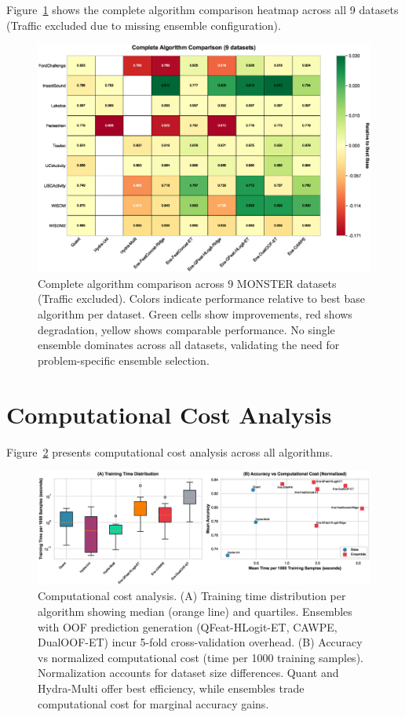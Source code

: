 \documentclass[pdflatex,sn-basic]{sn-jnl}           %
\theoremstyle{thmstyleone}%
\theoremstyle{thmstyletwo}%
\theoremstyle{thmstylethree}%
\begin{document}
\begin{appendices}
Figure~\ref{fig:full_heatmap} shows the complete algorithm comparison heatmap across all 9 datasets (Traffic excluded due to missing ensemble configuration).

\begin{figure}[!htb]
\centering
\includegraphics[width=\textwidth]{figureA1_full_heatmap}
\caption{Complete algorithm comparison across 9 MONSTER datasets (Traffic excluded). Colors indicate performance relative to best base algorithm per dataset. Green cells show improvements, red shows degradation, yellow shows comparable performance. No single ensemble dominates across all datasets, validating the need for problem-specific ensemble selection.}\label{fig:full_heatmap}
\end{figure}

\clearpage

\section{Computational Cost Analysis}\label{appE}

Figure~\ref{fig:computational} presents computational cost analysis across all algorithms.

\begin{figure}[!htb]
\centering
\includegraphics[width=\textwidth]{figureA2_computational_cost}
\caption{Computational cost analysis. (A) Training time distribution per algorithm showing median (orange line) and quartiles. Ensembles with OOF prediction generation (QFeat-HLogit-ET, CAWPE, DualOOF-ET) incur 5-fold cross-validation overhead. (B) Accuracy vs normalized computational cost (time per 1000 training samples). Normalization accounts for dataset size differences. Quant and Hydra-Multi offer best efficiency, while ensembles trade computational cost for marginal accuracy gains.}\label{fig:computational}
\end{figure}


\end{appendices}
\end{document}
